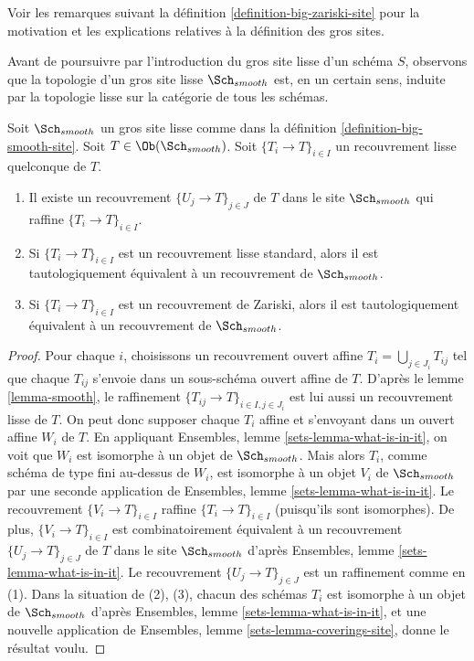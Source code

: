 \noindent
Voir les remarques suivant la définition \ref{definition-big-zariski-site}
pour la motivation et les explications relatives à la définition des gros sites.

\medskip\noindent
Avant de poursuivre par l'introduction du gros site lisse d'un
schéma $S$, observons que la topologie d'un gros site lisse
$\Sch_{smooth}$ est, en un certain sens, induite par la topologie lisse
sur la catégorie de tous les schémas.

\begin{lemma}
\label{lemma-smooth-induced}
Soit $\Sch_{smooth}$ un gros site lisse comme dans la
définition \ref{definition-big-smooth-site}.
Soit $T \in \Ob(\Sch_{smooth})$.
Soit $\{T_i \to T\}_{i \in I}$ un recouvrement lisse quelconque de $T$.
\begin{enumerate}
\item Il existe un recouvrement $\{U_j \to T\}_{j \in J}$ de $T$ dans le site
$\Sch_{smooth}$ qui raffine $\{T_i \to T\}_{i \in I}$.
\item Si $\{T_i \to T\}_{i \in I}$ est un recouvrement lisse standard, alors
il est tautologiquement équivalent à un recouvrement de $\Sch_{smooth}$.
\item Si $\{T_i \to T\}_{i \in I}$ est un recouvrement de Zariski, alors
il est tautologiquement équivalent à un recouvrement de $\Sch_{smooth}$.
\end{enumerate}
\end{lemma}

\begin{proof}
Pour chaque $i$, choisissons un recouvrement ouvert affine $T_i = \bigcup_{j \in J_i} T_{ij}$
tel que chaque $T_{ij}$ s'envoie dans un sous-schéma ouvert affine de $T$. D'après le
lemme \ref{lemma-smooth},
le raffinement $\{T_{ij} \to T\}_{i \in I, j \in J_i}$ est lui aussi un recouvrement lisse
de $T$. On peut donc supposer chaque $T_i$ affine et s'envoyant dans
un ouvert affine $W_i$ de $T$. En appliquant
Ensembles, lemme \ref{sets-lemma-what-is-in-it},
on voit que $W_i$ est isomorphe à un objet de $\Sch_{smooth}$.
Mais alors $T_i$, comme schéma de type fini au-dessus de $W_i$,
est isomorphe à un objet $V_i$ de $\Sch_{smooth}$ par une seconde
application de
Ensembles, lemme \ref{sets-lemma-what-is-in-it}.
Le recouvrement $\{V_i \to T\}_{i \in I}$ raffine $\{T_i \to T\}_{i \in I}$
(puisqu'ils sont isomorphes).
De plus, $\{V_i \to T\}_{i \in I}$ est combinatoirement équivalent à un
recouvrement $\{U_j \to T\}_{j \in J}$ de $T$ dans le site
$\Sch_{smooth}$ d'après
Ensembles, lemme \ref{sets-lemma-what-is-in-it}.
Le recouvrement $\{U_j \to T\}_{j \in J}$ est un raffinement comme en (1).
Dans la situation de (2), (3), chacun des
schémas $T_i$ est isomorphe à un objet de $\Sch_{smooth}$ d'après
Ensembles, lemme \ref{sets-lemma-what-is-in-it},
et une nouvelle application de
Ensembles, lemme \ref{sets-lemma-coverings-site},
donne le résultat voulu.
\end{proof}

